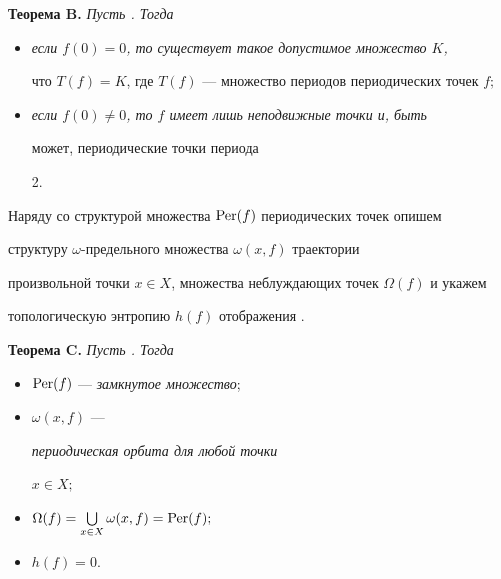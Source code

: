 \medskip





{\bf Теорема B.} {\it Пусть \fm{}. Тогда}


\begin{itemize}


\item[(B1)] {\it если $f(0)=0$, то существует такое допустимое множество $K$,


что $T(f)=K$, где $T(f)$ --- множество периодов периодических точек $f;$}


\item[(B2)] {\it если $f(0)\ne 0$, то $f$ имеет лишь неподвижные точки и, быть


может, периодические точки периода} 2.


\end{itemize}


\medskip





Наряду со структурой множества $\operatorname{Per}(f)$ периодических точек опишем


структуру $\omega $-пре\-дельного множества $\omega (x,f)$ траектории


произвольной точки $x\in X$, множества неблуждающих точек $\Omega (f)$ и укажем


топологическую энтропию $h(f)$ отображения \fm{}.


\medskip





{\bf Теорема C.} {\it Пусть \fm{}. Тогда}


\begin{itemize}


\item[(C1)] $\operatorname{Per}(f)$ --- {\it замкнутое множество};


\item[(C2)] $\omega (x,f)$ --- {\it периодическая орбита для любой точки


$x\in X;$}


\item[(C3)] $\Omega (f)=\bigcup\limits _{x\in X}\omega (x,f)=\operatorname{Per}(f);$


\item[(C4)] $h(f)=0$.


\end{itemize}


\medskip





